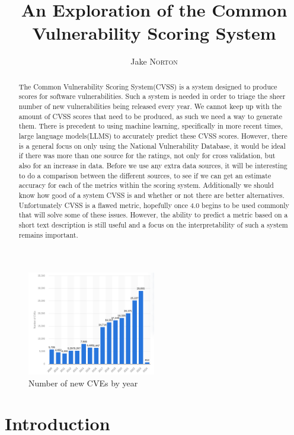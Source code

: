 \documentclass[12pt]{article}
\title{An Exploration of the Common Vulnerability Scoring System}
\author{Jake \textsc{Norton}}
\begin{document}
\maketitle

\begin{abstract}

	The Common Vulnerability Scoring System(CVSS) is a system designed to produce scores for software
	vulnerabilities. Such a system is needed in order to triage the sheer number of new
	vulnerabilities being released every year. We cannot keep up with the amount of CVSS scores that
	need to be produced, as such we need a way to generate them. There is precedent to using machine
	learning, specifically in more recent times, large language models(LLMS) to accurately predict
	these CVSS scores. However, there is a general focus on only using the National Vulnerability
	Database, it would be ideal if there was more than one source for the ratings, not only for cross
	validation, but also for an increase in data. Before we use any extra data sources, it will be
	interesting to do a comparison between the different sources, to see if we can get an estimate
	accuracy for each of the metrics within the scoring system. Additionally we should know how good
	of a system CVSS is and whether or not there are better alternatives. Unfortunately CVSS is a
	flawed metric, hopefully once 4.0 begins to be used commonly that will solve some of these issues.
	However, the ability to predict a metric based on a short text description is still useful and a
	focus on the interpretability of such a system remains important.

\end{abstract}

\begin{figure}
	\centering
	\includegraphics[width=0.5\textwidth]{figures/cve_year.png}
	\caption{\label{fig:cve_year}Number of new CVEs by year}
\end{figure}

\section{Introduction}
\end{document}
